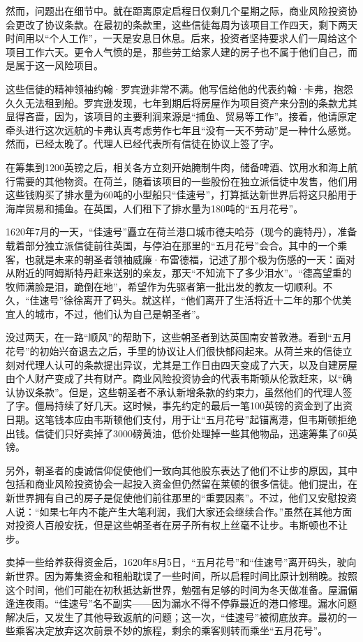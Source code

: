 \documentclass[12pt,oneside]{book}
\begin{document}
\begin{mdframed}
然而，问题出在细节中。就在距离原定启程日仅剩几个星期之际，商业风险投资协会更改了协议条款。在最初的条款里，这些信徒每周为该项目工作四天，剩下两天时间用以“个人工作”，一天是安息日休息。后来，投资者坚持要求人们一周给这个项目工作六天。更令人气愤的是，那些劳工给家人建的房子也不属于他们自己，而是属于这一风险项目。

这些信徒的精神领袖约翰·罗宾逊非常不满。他写信给他的代表约翰·卡弗，抱怨久久无法租到船。罗宾逊发现，七年到期后将房屋作为项目资产来分割的条款尤其显得吝啬，因为，该项目的主要利润来源是“捕鱼、贸易等工作”。接着，他请原定牵头进行这次远航的卡弗认真考虑劳作七年且“没有一天不劳动”是一种什么感觉。然而，已经太晚了。代理人已经代表所有信徒在协议上签了字。

在筹集到1200英镑之后，相关各方立刻开始腌制牛肉，储备啤酒、饮用水和海上航行需要的其他物资。在荷兰，随着该项目的一些股份在独立派信徒中发售，他们用这些钱购买了排水量为60吨的小型船只“佳速号”，打算抵达新世界后将这只船用于海岸贸易和捕鱼。在英国，人们租下了排水量为180吨的“五月花号”。

1620年7月的一天，“佳速号”矗立在荷兰港口城市德夫哈芬（现今的鹿特丹），准备载着部分独立派信徒前往英国，与停泊在那里的“五月花号”会合。其中的一个乘客，也就是未来的朝圣者领袖威廉·布雷德福，记述了那个极为伤感的一天：面对从附近的阿姆斯特丹赶来送别的亲友，那天“不知流下了多少泪水”。“德高望重的牧师满脸是泪，跪倒在地”，希望作为先驱者第一批出发的教友一切顺利。不久，“佳速号”徐徐离开了码头。就这样，“他们离开了生活将近十二年的那个优美宜人的城市，不过，他们认为自己是朝圣者”。

没过两天，在一路“顺风”的帮助下，这些朝圣者到达英国南安普敦港。看到“五月花号”的初始兴奋退去之后，手里的协议让人们很快郁闷起来。从荷兰来的信徒立刻对代理人认可的条款提出异议，尤其是工作日由四天变成了六天，以及自建房屋由个人财产变成了共有财产。商业风险投资协会的代表韦斯顿从伦敦赶来，以“确认协议条款”。但是，这些朝圣者不承认新增条款的约束力，虽然他们的代理人签了字。僵局持续了好几天。这时候，事先约定的最后一笔100英镑的资金到了出资日期。这笔钱本应由韦斯顿他们支付，用于让“五月花号”起锚离港，但韦斯顿拒绝出钱。信徒们只好卖掉了3000磅黄油，低价处理掉一些其他物品，迅速筹集了60英镑。

另外，朝圣者的虔诚信仰促使他们一致向其他股东表达了他们不让步的原因，其中包括和商业风险投资协会一起投入资金但仍然留在莱顿的很多信徒。他们提出，在新世界拥有自己的房子是促使他们前往那里的“重要因素”。不过，他们又安慰投资人说：“如果七年内不能产生大笔利润，我们大家还会继续合作。”虽然在其他方面对投资人百般安抚，但是这些朝圣者在房子所有权上丝毫不让步。韦斯顿也不让步。

卖掉一些给养获得资金后，1620年8月5日，“五月花号”和“佳速号”离开码头，驶向新世界。因为筹集资金和租船耽误了一些时间，所以启程时间比原计划稍晚。按照这个时间，他们可能在初秋抵达新世界，勉强有足够的时间为冬天做准备。屋漏偏逢连夜雨。“佳速号”名不副实——因为漏水不得不停靠最近的港口修理。漏水问题解决后，又发生了其他导致返航的问题；这一次，“佳速号”被彻底放弃。最初的一些乘客决定放弃这次前景不妙的旅程，剩余的乘客则转而乘坐“五月花号”。


\end{mdframed}
\end{document}
